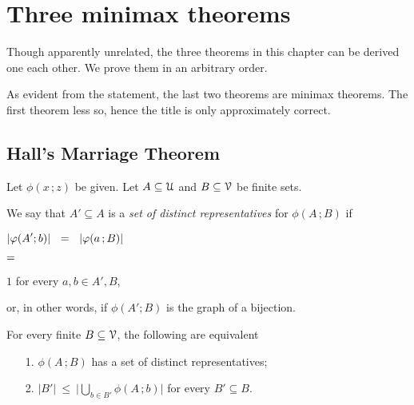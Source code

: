 \documentclass[scombinatorics.tex]{subfiles}
\begin{document}
\chapter{Three minimax theorems}
\label{minimax}

\def\medrel#1{\parbox[t]{6ex}{$\displaystyle\hfil #1$}}
\def\ceq#1#2#3{\parbox[t]{30ex}{$\displaystyle #1$}\medrel{#2}{$\displaystyle #3$}}

\def\separatore{\hfil o \rule[0.5ex]{4ex}{0.1ex} o \rule[0.5ex]{4ex}{0.1ex} o}

Though apparently unrelated, the three theorems in this chapter can be derived one each other.
We prove them in an arbitrary order.

As evident from the statement, the last two theorems are minimax theorems.
The first theorem less so, hence the title is only approximately correct.

\section{Hall's Marriage Theorem}\label{marriage}

\def\ceq#1#2#3{\parbox[t]{30ex}{$\displaystyle #1$}\medrel{#2}{$\displaystyle #3$}}

Let $\phi(x\,;z)$ be given. 
Let $A\subseteq\EuScript U$ and $B\subseteq\EuScript V$ be finite sets.

We say that $A'\subseteq A$ is a \emph{set of distinct representatives\/} for $\phi(A\,;B)$ if

\ceq{\hfill|\phi(A';b)|\medrel{=}|\phi(a\,;B)|}
{=}
{1}
\quad for every $a,b\in A',B$,

or, in other words, if $\phi(A';B)$ is the graph of a bijection.

\begin{void_thm}\label{thm_marriage}
  For every finite $B\subseteq\EuScript V$, the following are equivalent
  \begin{itemize}
    \item[1.] $\phi(A\,;B)$ has a set of distinct representatives;

    \item[2.] $\displaystyle|B'|\ \le\ \bigg|\bigcup_{b\in B'}\phi(A\,;b)\bigg|$ for every $B'\subseteq B$.
  \end{itemize}
\end{void_thm}
\end{document}
